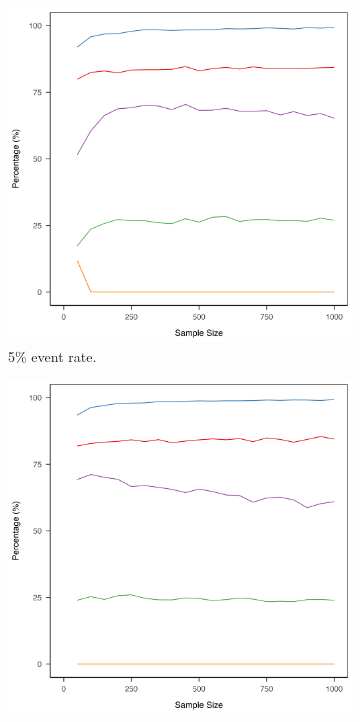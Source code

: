 \documentclass[AMA,STIX1COL]{WileyNJD-v5}
\begin{document}
\begin{figure}[h]
\centering
{}
\begin{subfigure}{0.29\textwidth}
    \includegraphics[width=\textwidth]{"experiment_2/plot.05.png"}
    \caption{5\% event rate.}
    \label{fig:sub-1-figure-1}
\end{subfigure}
\hspace{-0.1cm}
\begin{subfigure}{0.29\textwidth}
    \includegraphics[width=\textwidth]{"experiment_2/plot.20.png"}

\end{subfigure}
\end{figure}
\end{document}
